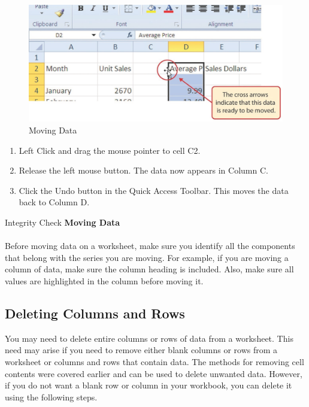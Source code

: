 \begin{figure}[H]
	\centering
	\includegraphics[width=\maxwidth{.95\linewidth}]{gfx/ch01_fig30}
	\caption{Moving Data}
	\label{01:fig30}
\end{figure}

\begin{enumerate}[resume]
	\item Left Click and drag the mouse pointer to cell \textsf{C2}.
	\item Release the left mouse button. The data now appears in Column \textsf{C}.
	\item Click the Undo button in the Quick Access Toolbar. This moves the data back to Column \textsf{D}.
\end{enumerate}

\begin{center}
	\begin{infobox}{Integrity Check}
		\textbf{Moving Data}
		\\
		\\
		Before moving data on a worksheet, make sure you identify all the components that belong with the series you are moving. For example, if you are moving a column of data, make sure the column heading is included. Also, make sure all values are highlighted in the column before moving it.
	\end{infobox}
\end{center}


\subsection{Deleting Columns and Rows}

You may need to delete entire columns or rows of data from a worksheet. This need may arise if you need to remove either blank columns or rows from a worksheet or columns and rows that contain data. The methods for removing cell contents were covered earlier and can be used to delete unwanted data. However, if you do not want a blank row or column in your workbook, you can delete it using the following steps.

